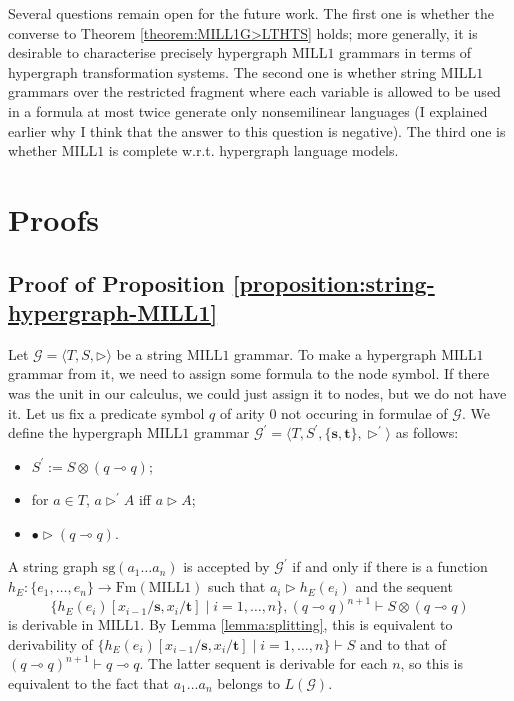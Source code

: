 \documentclass[a4paper,UKenglish,cleveref, autoref, thm-restate,pdfa]{lipics-v2021}
\newcommand{\eqdef}{:=}
\newcommand{\Gram}{\mathcal{G}}
\newcommand{\SG}{\mathrm{sg}}
\newcommand{\lt}{\mathbf{s}}
\newcommand{\rt}{\mathbf{t}}
\newcommand{\Fm}{\mathrm{Fm}}
\newcommand{\mconj}{\otimes}
\newcommand{\limpl}{\multimap}
\newcommand{\MILLFO}{\mathrm{MILL}1}
\begin{document}
Several questions remain open for the future work. The first one is whether the converse to Theorem \ref{theorem:MILL1G>LTHTS} holds; more generally, it is desirable to characterise precisely hypergraph $\MILLFO$ grammars in terms of hypergraph transformation systems. The second one is whether string $\MILLFO$ grammars over the restricted fragment where each variable is allowed to be used in a formula at most twice generate only nonsemilinear languages (I explained earlier why I think that the answer to this question is negative). The third one is whether $\MILLFO$ is complete w.r.t. hypergraph language models.



\appendix


\newpage

\section{Proofs}


\subsection{Proof of Proposition \ref{proposition:string-hypergraph-MILL1}}\label{appendix:proof-proposition:string-hypergraph-MILL1}

Let $\Gram=\langle T, S, \triangleright \rangle$ be a string $\MILLFO$ grammar. To make a hypergraph $\MILLFO$ grammar from it, we need to assign some formula to the node symbol. If there was the unit in our calculus, we could just assign it to nodes, but we do not have it. Let us fix a predicate symbol $q$ of arity $0$ not occuring in formulae of $\Gram$. We define the hypergraph $\MILLFO$ grammar $\Gram^\prime = \langle T, S^\prime, \{\lt,\rt\},\triangleright^\prime \rangle$ as follows:
\begin{itemize}
	\item $S^\prime \eqdef S \mconj (q \limpl q)$;
	\item for $a \in T$, $a \triangleright^\prime A$ iff $a \triangleright A$;
	\item $\bullet \triangleright (q \limpl q)$.
\end{itemize}
A string graph $\SG(a_1\ldots a_n)$ is accepted by $\Gram^\prime$ if and only if there is a function $h_E:\{e_1,\ldots,e_n\} \to \Fm(\MILLFO)$ such that $a_i \triangleright h_E(e_i)$ and the sequent
$$
\{h_E(e_i)[x_{i-1}/\lt,x_i/\rt] \mid i=1,\ldots,n\}, (q \limpl q)^{n+1} \vdash S \mconj (q \limpl q)
$$ 
is derivable in $\MILLFO$. By Lemma \ref{lemma:splitting}, this is equivalent to derivability of $\{h_E(e_i)[x_{i-1}/\lt,x_i/\rt] \mid i=1,\ldots,n\} \vdash S $ and to that of $(q \limpl q)^{n+1} \vdash q \limpl q$. The latter sequent is derivable for each $n$, so this is equivalent to the fact that $a_1\ldots a_n$ belongs to $L(\Gram)$.
\end{document}
